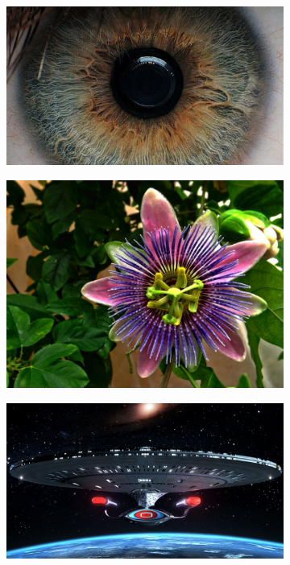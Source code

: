 \documentclass{article}
\begin{document}
\begin{figure}[H]
\centering
\begin{subfigure}{.5\textwidth}
  \centering
  \includegraphics[width=0.97\linewidth]{_Figures/sample_1.jpg}
  \caption{}
  \label{fig:sample_1}
\end{subfigure}%
\begin{subfigure}{.5\textwidth}
  \centering
  \includegraphics[width=0.97\linewidth]{_Figures/sample_2.jpg}
    \caption{}
  \label{fig:sample_2}
\end{subfigure}
\begin{subfigure}{.5\textwidth}
  \centering
  \includegraphics[width=0.97\linewidth]{_Figures/sample_3.jpg}

\end{subfigure}
\end{figure}
\end{document}

